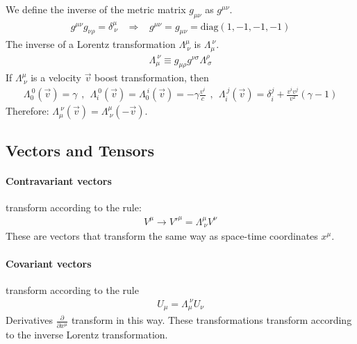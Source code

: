 We define the inverse of the metric matrix $g_{\mu \nu}$ as $g^{\mu \nu}$.
\begin{align*}
    g^{\mu \nu} g_{\nu \rho} = \delta^\mu_{\ \nu}
    \hspace{10pt} \Rightarrow \hspace{10pt}
    g^{\mu \nu} = g_{\mu \nu} = \text{diag}(1,-1,-1,-1)
\end{align*}
The inverse of a Lorentz transformation $\Lambda_{\ \nu}^\mu$ is
$\Lambda_\mu^{\ \nu}$.
\begin{align*}
    \Lambda_\mu^{\ \nu} \equiv g_{\mu \rho} g^{\nu \sigma} \Lambda_{\ \sigma}^\rho
\end{align*}
If $\Lambda_{\ \nu}^\mu$ is a velocity $\vec{v}$ boost transformation, then
\begin{align*}
    \Lambda_0^{\ 0} (\vec{v}) = \gamma
    \hspace{5pt} , \hspace{5pt}
    \Lambda_i^{\ 0} (\vec{v}) = \Lambda_0^{\ i} (\vec{v}) = - \gamma \frac{v^i}{c}
    \hspace{5pt} , \hspace{5pt}
    \Lambda_i^{\ j} (\vec{v}) = \delta_i^j + \frac{v^i v^j}{v^2} (\gamma - 1)
\end{align*}
Therefore: $\Lambda_\mu^{\ \nu} (\vec{v}) = \Lambda_{\ \nu}^\mu (- \vec{v})$.

\subsection{Vectors and Tensors}

\paragraph{Contravariant vectors} transform according to the rule:
\begin{align*}
    V^\mu \rightarrow V'^\mu = \Lambda_{\ \nu}^\mu V^\nu
\end{align*}
These are vectors that transform the same way as space-time coordinates $x^\mu$.

\paragraph{Covariant vectors} transform according to the rule
\begin{align*}
    U_\mu = \Lambda_\mu^{\ \nu} U_\nu
\end{align*}
Derivatives $\frac{\partial}{\partial x^\mu}$ transform in this way.
These transformations transform according to the inverse Lorentz
transformation.

